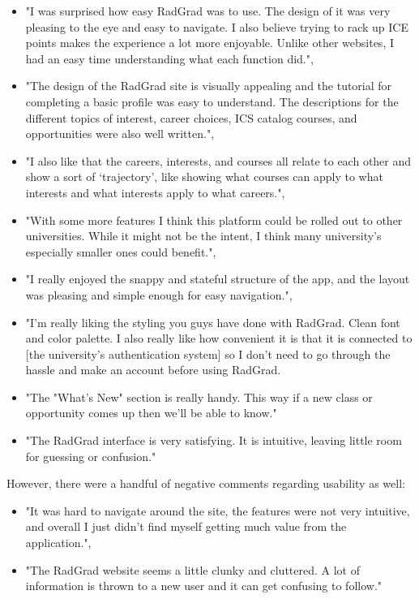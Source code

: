 \documentclass[acmsmall,nonacm]{acmart}
\begin{document}
\begin{itemize}[leftmargin=*]
\item "I was surprised how easy RadGrad was to use. The design of it was very pleasing to the eye and easy to navigate. I also believe trying to rack up ICE points makes the experience a lot more enjoyable. Unlike other websites, I had an easy time understanding what each function did.",
\item "The design of the RadGrad site is visually appealing and the tutorial for completing a basic profile was easy to understand. The descriptions for the different topics of interest, career choices, ICS catalog courses, and opportunities were also well written.",
\item "I also like that the careers, interests, and courses all relate to each other and show a sort of ‘trajectory’, like showing what courses can apply to what interests and what interests apply to what careers.",
\item "With some more features I think this platform could be rolled out to other universities. While it might not be the intent, I think many university’s especially smaller ones could benefit.",
\item "I really enjoyed the snappy and stateful structure of the app, and the layout was pleasing and simple enough for easy navigation.",
\item "I'm really liking the styling you guys have done with RadGrad. Clean font and color palette. I also really like how convenient it is that it is connected to [the university's authentication system] so I don't need to go through the hassle and make an account before using RadGrad.
\item "The "What's New" section is really handy. This way if a new class or opportunity comes up then we'll be able to know."
\item "The RadGrad interface is very satisfying. It is intuitive, leaving little room for guessing or confusion."
\end{itemize}

However, there were a handful of negative comments regarding usability as well:
\begin{itemize}[leftmargin=*]
\item "It was hard to navigate around the site, the features were not very intuitive, and overall I just didn’t find myself getting much value from the application.",
\item "The RadGrad website seems a little clunky and cluttered. A lot of information is thrown to a new user and it can get confusing to follow."
\end{itemize}
\end{document}
